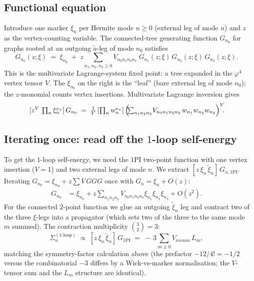 \documentclass[11pt,a4paper]{article}
\begin{document}
\subsection{Functional equation}

Introduce one marker $\xi_{n}$ per Hermite mode $n\ge 0$ (external leg of mode $n$) and
$z$ as the vertex-counting variable. The connected-tree generating function $G_{n_{0}}$ for
graphs rooted at an outgoing $\widetilde a$-leg of mode $n_{0}$ satisfies
\[
\boxed{\;
G_{n_{0}}(z;\xi) \;=\; \xi_{n_{0}}
\;+\; z \!\sum_{n_{1},n_{2},n_{3}\ge 0}\!\!V_{n_{0}n_{1}n_{2}n_{3}}\;
G_{n_{1}}(z;\xi)\,G_{n_{2}}(z;\xi)\,G_{n_{3}}(z;\xi).
\;}
\]
This is the multivariate Lagrange-system fixed point: a tree expanded in the $\varphi^{4}$
vertex tensor $V$. The $\xi_{n_{0}}$ on the right is the ``leaf'' (bare external leg of
mode $n_{0}$); the $z$-monomial counts vertex insertions. Multivariate Lagrange inversion
\cite{Goulden} gives
\[
[z^{V}\,\textstyle\prod_{n}\xi_{n}^{e_{n}}]\,G_{n_{0}}
\;=\; \frac{1}{V}\,[\textstyle\prod_{n}w_{n}^{e_{n}}]\,
\Bigl(\!\!\sum_{n_{1}n_{2}n_{3}}\!V_{n_{0}n_{1}n_{2}n_{3}}\,w_{n_{1}}w_{n_{2}}w_{n_{3}}\Bigr)^{V}\!\!.
\]

\subsection{Iterating once: read off the $1$-loop self-energy}

To get the $1$-loop self-energy, we need the $1$PI two-point function with one vertex
insertion ($V=1$) and two external legs of mode $n$. We extract
$[z\,\xi_{n}\,\widetilde\xi_{n}]\,G_{n,\text{1PI}}$. Iterating $G_{n_{0}} = \xi_{n_{0}} +
z\sum V\,GGG$ once with $G_{n}=\xi_{n}+O(z)$:
\begin{align*}
G_{n_{0}} &= \xi_{n_{0}} + z\!\sum_{n_{1}n_{2}n_{3}}\!\!V_{n_{0}n_{1}n_{2}n_{3}}\xi_{n_{1}}\xi_{n_{2}}\xi_{n_{3}} + O(z^{2}).
\end{align*}
For the connected $2$-point function we glue an outgoing $\widetilde\xi_{n}$ leg and contract
two of the three $\xi$-legs into a propagator (which sets two of the three to the same mode
$m$ summed). The contraction multiplicity $\binom{3}{2}=3$:
\[
\Sigma_{n}^{(1\text{-loop})} \;\propto\; [z\,\xi_{n}\,\widetilde\xi_{n}]\,G_{\text{1PI}}
\;=\; -\,3\!\sum_{m\ge 0} V_{n n m m}\,L_{m},
\]
matching the symmetry-factor calculation above (the prefactor $-12/4! = -1/2$ versus the
combinatorial $-3$ differs by a Wick-vs-marker normalisation; the $V$-tensor sum and the
$L_{m}$ structure are identical).
\end{document}
